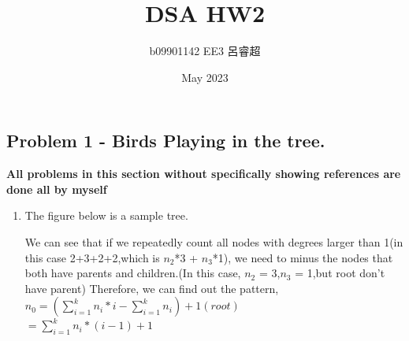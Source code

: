 \documentclass{article}
\title{DSA HW2}
\author{b09901142 EE3 呂睿超}
\date{May 2023}
\begin{document}
\begin{CJK*}{UTF8}{bsmi}
\maketitle

\section{Problem 1 - Birds Playing in the tree.}
\textbf{All problems in this section without specifically showing references are done all by myself}

\begin{enumerate}
    \item The figure below is a sample tree.
    \begin{figure}[h]
\end{figure}
We can see that if we repeatedly count all nodes with degrees larger than 1(in this case 2+3+2+2,which is $n_2$*3 + $n_3$*1), we need to minus the nodes that both have parents and children.(In this case, $n_2$ = 3,$n_3$ = 1,but root don't have parent)
Therefore, we can find out the pattern,\\
$n_0 = (\sum_{i=1}^{k} n_i*i - \sum_{i=1}^{k} {n_i}) + 1 (root)$\\
$ = \sum_{i=1}^{k} {n_i*(i-1)} + 1$
   


\end{enumerate}
\end{CJK*}
\end{document}
